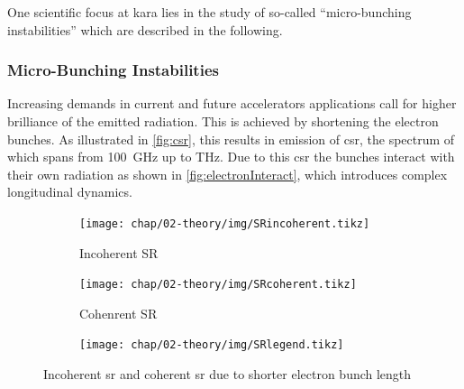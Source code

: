 One scientific focus at \gls{kara} lies in the study of so-called ``micro-bunching instabilities'' which are described in the following.

\subsubsection*{Micro-Bunching Instabilities}
Increasing demands in current and future accelerators applications call for higher brilliance of the emitted radiation.
This is achieved by shortening the electron bunches. 
As illustrated in \autoref{fig:csr}, this results in emission of \gls{csr}, the spectrum of which spans from \SI{100}{\GHz} up to THz.
Due to this \gls{csr} the bunches interact with their own radiation as shown in \autoref{fig:electronInteract}, which introduces complex longitudinal dynamics.
\begin{figure}[tbh]
	\centering
	\begin{subfigure}{0.4\textwidth}
		\centering
		\texttt{[image: chap/02-theory/img/SRincoherent.tikz]}  
		\caption{Incoherent SR}
		\label{fig:srincoherent}
	\end{subfigure}
	\hfill
	\begin{subfigure}{0.4\textwidth}
		\centering
		\texttt{[image: chap/02-theory/img/SRcoherent.tikz]}  
		\caption{Cohenrent SR}
		\label{fig:srcoherent}
	\end{subfigure}

	\begin{center}
		\begin{subfigure}{0.4\textwidth}
			\centering
			\texttt{[image: chap/02-theory/img/SRlegend.tikz]}  
			\label{fig:srlegend}
		\end{subfigure}
	\end{center}
	\caption[Incoherent and coherent SR]{Incoherent \gls{sr} and coherent \gls{sr} due to shorter electron bunch length \cite{rota2018}}
	\label{fig:csr}
\end{figure}


